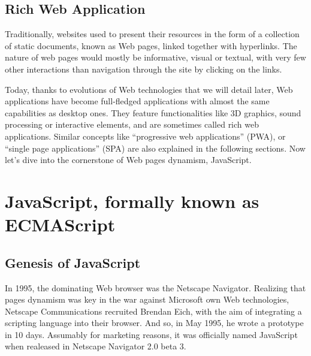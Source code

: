 



\subsection{Rich Web Application}%
\label{sub:rich_web_application}

Traditionally, websites used to present their resources in the form of a collection
of static documents, known as Web pages, linked together with hyperlinks.
The nature of web pages would mostly be informative, visual or textual,
with very few other interactions than navigation through the site by
clicking on the links.

Today, thanks to evolutions of Web technologies that we will detail later,
Web applications have become full-fledged applications with almost
the same capabilities as desktop ones.
They feature functionalities like 3D graphics, sound processing or interactive elements,
and are sometimes called rich web applications.
Similar concepts like ``progressive web applications'' (PWA),
or ``single page applications'' (SPA) are also explained in the following sections.
Now let's dive into the cornerstone of Web pages dynamism, JavaScript.


\section{JavaScript, formally known as ECMAScript}%
\label{sec:javascript_formally_known_as_ecmascript}

\subsection{Genesis of JavaScript}%
\label{sub:genesis_of_javascript}

In 1995, the dominating Web browser was the Netscape Navigator.
Realizing that pages dynamism was key in the war against Microsoft
own Web technologies, Netscape Communications recruited Brendan Eich,
with the aim of integrating a scripting language into their browser.
And so, in May 1995, he wrote a prototype in 10 days.
Assumably for marketing reasons, it was officially named JavaScript
when realeased in Netscape Navigator 2.0 beta 3.

